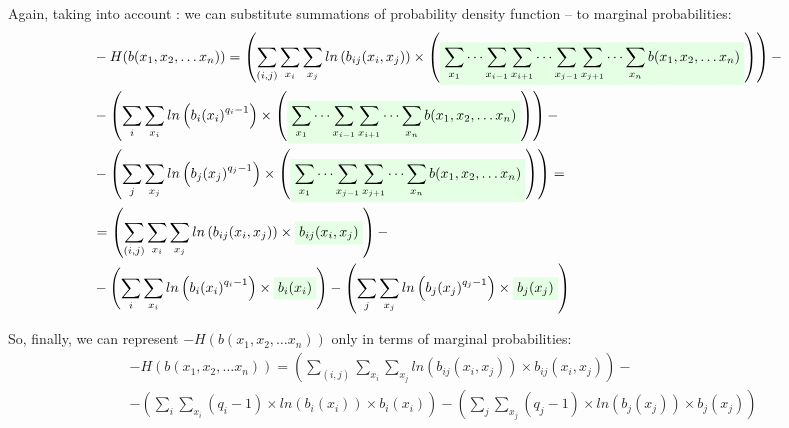 \documentclass[fleqn,leqno]{article}
\newcommand{\highlight}[1]{\colorbox{green!10}{$\displaystyle#1$}}
\begin{document}
Again, taking into account : we can substitute summations of probability density function -- to marginal probabilities:
\begin{equation}
\begin{split}
  & -H(b(x_1,x_2,\dots x_n)) = \left( \sum_{(i, j)} \sum_{x_i} \sum_{x_j} ln \left( b_{ij}(x_i, x_j) \right) \times \left( \highlight{ \sum_{x_1} \cdots \sum_{x_{i-1}} \sum_{x_{i+1}} \cdots \sum_{x_{j-1}} \sum_{x_{j+1}} \cdots \sum_{x_n} b(x_1, x_2, \dots x_n) } \right) \right) - \\
  & -\left( \sum_i \sum_{x_i} ln \left({b_i(x_i)}^{q_i - 1}\right) \times \left( \highlight{ \sum_{x_1} \cdots \sum_{x_{i - 1}} \sum_{x_{i + 1}} \cdots \sum_{x_n} b(x_1, x_2, \dots x_n) } \right) \right) - \\
  & -\left( \sum_j \sum_{x_j} ln \left({b_j(x_j)}^{q_j - 1}\right) \times \left( \highlight{ \sum_{x_1} \cdots \sum_{x_{j - 1}} \sum_{x_{j + 1}} \cdots \sum_{x_n} b(x_1, x_2, \dots x_n) } \right) \right) = \\
  & = \left( \sum_{(i, j)} \sum_{x_i} \sum_{x_j} ln \left( b_{ij}(x_i, x_j) \right) \times \highlight{ b_{ij}(x_i, x_j) } \right) - \\
  & -\left( \sum_i \sum_{x_i} ln \left({b_i(x_i)}^{q_i - 1}\right) \times \highlight{ b_i(x_i) } \right) - \left( \sum_j \sum_{x_j} ln \left({b_j(x_j)}^{q_j - 1}\right) \times \highlight{ b_j(x_j) } \right)
\end{split}
\end{equation}

So, finally, we can represent $-H(b(x_1,x_2,\dots x_n))$ only in terms of marginal probabilities:
\begin{equation} \label{eq:H_in_terms_of_local_marginals}
\begin{split}
  & -H(b(x_1,x_2,\dots x_n)) = \left( \sum_{(i, j)} \sum_{x_i} \sum_{x_j} ln \left( b_{ij}(x_i, x_j) \right) \times b_{ij}(x_i, x_j) \right) - \\
  & -\left( \sum_i \sum_{x_i} (q_i - 1) \times ln(b_i(x_i)) \times b_i(x_i) \right) - \left( \sum_j \sum_{x_j} (q_j - 1) \times ln(b_j(x_j)) \times b_j(x_j) \right)
\end{split}
\end{equation}
\end{document}
